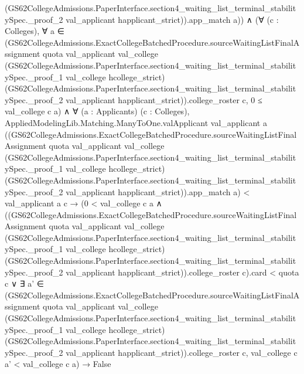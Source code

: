 \documentclass[10pt]{article}
\begin{document}
\begin{ReviewVerbatim}
                    (GS62CollegeAdmissions.PaperInterface.section4_waiting_list_terminal_stabilitySpec._proof_2
                      val_applicant happlicant_strict)).app_match
                a)) ∧
        (∀ (c : Colleges),
            ∀
              a ∈
                (GS62CollegeAdmissions.ExactCollegeBatchedProcedure.sourceWaitingListFinalAssignment quota val_applicant
                      val_college
                      (GS62CollegeAdmissions.PaperInterface.section4_waiting_list_terminal_stabilitySpec._proof_1
                        val_college hcollege_strict)
                      (GS62CollegeAdmissions.PaperInterface.section4_waiting_list_terminal_stabilitySpec._proof_2
                        val_applicant happlicant_strict)).college_roster
                  c,
              0 ≤ val_college c a) ∧
          ∀ (a : Applicants) (c : Colleges),
            AppliedModelingLib.Matching.ManyToOne.valApplicant val_applicant a
                  ((GS62CollegeAdmissions.ExactCollegeBatchedProcedure.sourceWaitingListFinalAssignment quota
                        val_applicant val_college
                        (GS62CollegeAdmissions.PaperInterface.section4_waiting_list_terminal_stabilitySpec._proof_1
                          val_college hcollege_strict)
                        (GS62CollegeAdmissions.PaperInterface.section4_waiting_list_terminal_stabilitySpec._proof_2
                          val_applicant happlicant_strict)).app_match
                    a) <
                val_applicant a c →
              (0 < val_college c a ∧
                    ((GS62CollegeAdmissions.ExactCollegeBatchedProcedure.sourceWaitingListFinalAssignment quota
                              val_applicant val_college
                              (GS62CollegeAdmissions.PaperInterface.section4_waiting_list_terminal_stabilitySpec._proof_1
                                val_college hcollege_strict)
                              (GS62CollegeAdmissions.PaperInterface.section4_waiting_list_terminal_stabilitySpec._proof_2
                                val_applicant happlicant_strict)).college_roster
                          c).card <
                      quota c ∨
                  ∃
                    a' ∈
                      (GS62CollegeAdmissions.ExactCollegeBatchedProcedure.sourceWaitingListFinalAssignment quota
                            val_applicant val_college
                            (GS62CollegeAdmissions.PaperInterface.section4_waiting_list_terminal_stabilitySpec._proof_1
                              val_college hcollege_strict)
                            (GS62CollegeAdmissions.PaperInterface.section4_waiting_list_terminal_stabilitySpec._proof_2
                              val_applicant happlicant_strict)).college_roster
                        c,
                    val_college c a' < val_college c a) →
                False
\end{ReviewVerbatim}
\end{document}
